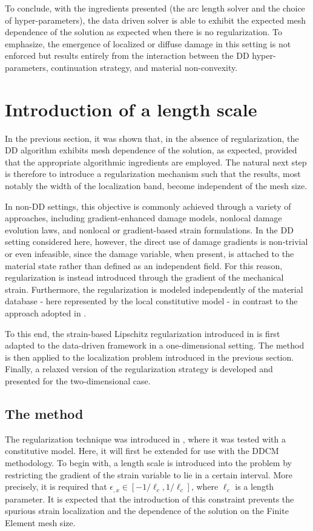 \documentclass[10pt,review]{cas-sc}
\begin{document}
To conclude, with the ingredients presented (the arc length solver and the choice of hyper-parameters), the data driven solver is able to exhibit the expected mesh dependence of the solution as expected when there is no regularization. To emphasize, the emergence of localized or diffuse damage in this setting is not enforced but results entirely from the interaction between the DD hyper-parameters, continuation strategy, and material non-convexity. 


\section{Introduction of a length scale}

In the previous section, it was shown that, in the absence of regularization, the DD algorithm exhibits mesh dependence of the solution, as expected, provided that the appropriate algorithmic ingredients are employed. The natural next step is therefore to introduce a regularization mechanism such that the results, most notably the width of the localization band, become independent of the mesh size.

In non-DD settings, this objective is commonly achieved through a variety of approaches, including gradient-enhanced damage models, nonlocal damage evolution laws, and nonlocal or gradient-based strain formulations. In the DD setting considered here, however, the direct use of damage gradients is non-trivial or even infeasible, since the damage variable, when present, is attached to the material state rather than defined as an independent field. For this reason, regularization is instead introduced through the gradient of the mechanical strain. Furthermore, the regularization is modeled independently of the material database - here represented by the local constitutive model - in contrast to the approach adopted in \cite{Ulloa2024}.

To this end, the strain-based Lipschitz regularization introduced in \cite{Kamasamudram2023} is first adapted to the data-driven framework in a one-dimensional setting. The method is then applied to the localization problem introduced in the previous section. Finally, a relaxed version of the regularization strategy is developed and presented for the two-dimensional case.


\subsection{The method\label{sec:length_scale}}
The regularization technique was introduced in \cite{Kamasamudram2023}, where it was tested with a constitutive model. Here, it will first be extended for use with the DDCM methodology. To begin with, a length scale is introduced into the problem by restricting the gradient of the strain variable to lie in a certain interval. More precisely, it is required that $\epsilon_{,x} \in [-1/{\ell_c}, 1/{\ell_c} ]$, where $\ell_c$ is a length parameter. It is expected that the introduction of this constraint prevents the spurious strain localization and the dependence of the solution on the Finite Element mesh size. 
\end{document}
